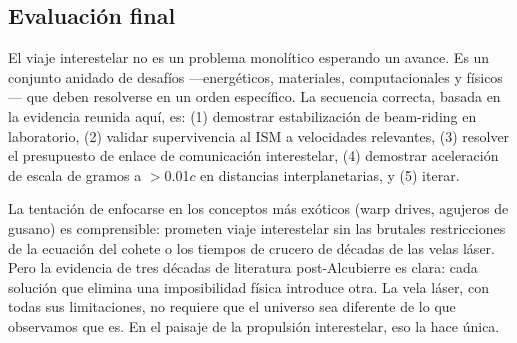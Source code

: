 \documentclass[11pt,a4paper,onecolumn]{article}
\begin{document}
\subsection{Evaluación final}

El viaje interestelar no es un problema monolítico esperando un avance. Es un conjunto anidado de desafíos —energéticos, materiales, computacionales y físicos— que deben resolverse en un orden específico. La secuencia correcta, basada en la evidencia reunida aquí, es: (1) demostrar estabilización de beam-riding en laboratorio, (2) validar supervivencia al ISM a velocidades relevantes, (3) resolver el presupuesto de enlace de comunicación interestelar, (4) demostrar aceleración de escala de gramos a $>$0.01$c$ en distancias interplanetarias, y (5) iterar.

La tentación de enfocarse en los conceptos más exóticos (warp drives, agujeros de gusano) es comprensible: prometen viaje interestelar sin las brutales restricciones de la ecuación del cohete o los tiempos de crucero de décadas de las velas láser. Pero la evidencia de tres décadas de literatura post-Alcubierre es clara: cada solución que elimina una imposibilidad física introduce otra. La vela láser, con todas sus limitaciones, no requiere que el universo sea diferente de lo que observamos que es. En el paisaje de la propulsión interestelar, eso la hace única.

\end{document}
